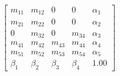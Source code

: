 \documentclass[11pt]{article}
\begin{document}

\begin{equation}
  \label{eq:p5}
      \left[
      \begin{array}{ccccc}
        m_{11} & m_{12} & 0 & 0 & \alpha_{1} \\
        m_{21} & m_{22} & 0 & 0 & \alpha_{2} \\
        0 & m_{32} & 0 & m_{34} & \alpha_{3} \\
        m_{41} & m_{42} & m_{43} & m_{44} & \alpha_{4} \\
        m_{51} & m_{52} & m_{53} & m_{54} & \alpha_{5} \\
        \beta_{1} & \beta_{2} & \beta_{3} & \beta_{4} & 1.00
      \end{array}
\right]
\end{equation}
\end{document}
